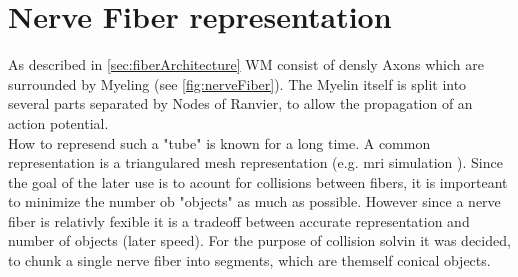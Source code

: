 % 
% 
\section{Nerve Fiber representation}
% 
As described in \cref{sec:fiberArchitecture} \ac{WM} consist of densly Axons which are surrounded by Myeling (see \cref{fig:nerveFiber}).
The Myelin itself is split into several parts separated by Nodes of Ranvier, to allow the propagation of an action potential.\\
% 
How to represend such a "tube" is known for a long time. A common representation is a triangulared mesh representation (e.g. mri simulation \dummy). Since the goal of the later use is to acount for collisions between fibers, it is importeant to minimize the number ob "objects" as much as possible. However since a nerve fiber is relativly fexible it is a tradeoff between accurate representation and number of objects (later speed).
% 
For the purpose of collision solvin it was decided, to chunk a single nerve fiber into segments, which are themself conical objects.

